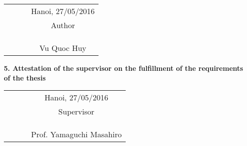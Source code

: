\begin{acknowledgementslong}
\begin{tabular}{l l l c }
    \textbf{ } \hspace*{35pt} \textbf{ } &  \textbf{ } \hspace*{35pt} \textbf{ } & \textbf{ } \hspace*{35pt} \textbf{ } & Hanoi, 27/05/2016 \\ 
    \textbf{ } \hspace*{35pt} \textbf{ } &  \textbf{ } \hspace*{35pt} \textbf{ } & \textbf{ } \hspace*{35pt} \textbf{ } & Author \\
    \\
    \\
    \\
    \textbf{ } \hspace*{35pt} \textbf{ } &  \textbf{ } \hspace*{35pt} \textbf{ } & \textbf{ } \hspace*{35pt} \textbf{ } & Vu Quoc Huy
    \end{tabular}

    
\textbf{5. Attestation of the supervisor on the fulfillment of the requirements of the thesis}
\\[5cm]
\begin{tabular}{l l l c }
    \textbf{ } \hspace*{35pt} \textbf{ } &  \textbf{ } \hspace*{35pt} \textbf{ } & \textbf{ } \hspace*{35pt} \textbf{ } & Hanoi, 27/05/2016 \\ 
    \textbf{ } \hspace*{35pt} \textbf{ } &  \textbf{ } \hspace*{35pt} \textbf{ } & \textbf{ } \hspace*{35pt} \textbf{ } & Supervisor \\
    \\
    \\
    \\
    \textbf{ } \hspace*{35pt} \textbf{ } &  \textbf{ } \hspace*{35pt} \textbf{ } & \textbf{ } \hspace*{35pt} \textbf{ } & Prof. Yamaguchi Masahiro
    \end{tabular}

\end{acknowledgementslong}
  